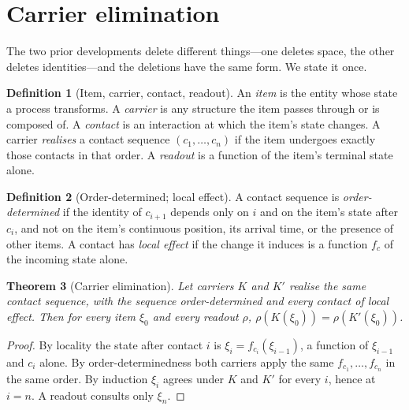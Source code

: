 \documentclass[11pt,a4paper]{article}
\theoremstyle{clthm}
\newtheorem{theorem}{Theorem}[section]
\theoremstyle{definition}
\newtheorem{definition}[theorem]{Definition}
\theoremstyle{remark}
\begin{document}
\section{Carrier elimination}
\label{sec:elimination}

The two prior developments delete different things---one deletes space,
the other deletes identities---and the deletions have the same form. We
state it once.

\begin{definition}[Item, carrier, contact, readout]
\label{def:carrier}
An \emph{item} is the entity whose state a process transforms. A
\emph{carrier} is any structure the item passes through or is composed of.
A \emph{contact} is an interaction at which the item's state changes. A
carrier \emph{realises} a contact sequence $(c_1,\dots,c_n)$ if the item
undergoes exactly those contacts in that order. A \emph{readout} is a
function of the item's terminal state alone.
\end{definition}

\begin{definition}[Order-determined; local effect]
\label{def:hyp}
A contact sequence is \emph{order-determined} if the identity of $c_{i+1}$
depends only on $i$ and on the item's state after $c_i$, and not on the
item's continuous position, its arrival time, or the presence of other
items. A contact has \emph{local effect} if the change it induces is a
function $f_{c}$ of the incoming state alone.
\end{definition}

\begin{theorem}[Carrier elimination]
\label{thm:elim}
Let carriers $K$ and $K'$ realise the same contact sequence, with the
sequence order-determined and every contact of local effect. Then for
every item $\xi_0$ and every readout $\rho$,
$\rho(K(\xi_0))=\rho(K'(\xi_0))$.
\end{theorem}

\begin{proof}
By locality the state after contact $i$ is $\xi_i=f_{c_i}(\xi_{i-1})$, a
function of $\xi_{i-1}$ and $c_i$ alone. By order-determinedness both
carriers apply the same $f_{c_1},\dots,f_{c_n}$ in the same order. By
induction $\xi_i$ agrees under $K$ and $K'$ for every $i$, hence at
$i=n$. A readout consults only $\xi_n$.
\end{proof}
\end{document}
